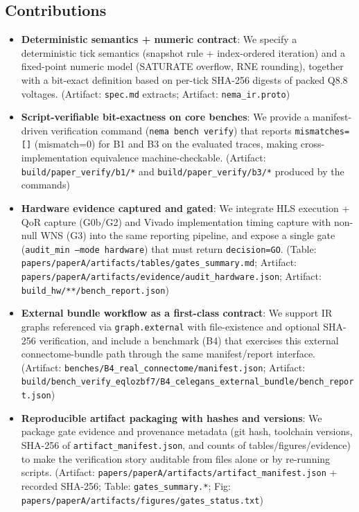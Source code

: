 \subsection{Contributions}
\begin{itemize}
\item \textbf{Deterministic semantics + numeric contract}: We specify a deterministic tick semantics (snapshot rule + index-ordered iteration) and a fixed-point numeric model (SATURATE overflow, RNE rounding), together with a bit-exact definition based on per-tick SHA-256 digests of packed Q8.8 voltages. (Artifact: \texttt{spec.md} extracts; Artifact: \texttt{nema\_ir.proto})
\item \textbf{Script-verifiable bit-exactness on core benches}: We provide a manifest-driven verification command (\texttt{nema bench verify}) that reports \texttt{mismatches=[]} (mismatch=0) for B1 and B3 on the evaluated traces, making cross-implementation equivalence machine-checkable. (Artifact: \texttt{build/paper\_verify/b1/*} and \texttt{build/paper\_verify/b3/*} produced by the commands)
\item \textbf{Hardware evidence captured and gated}: We integrate HLS execution + QoR capture (G0b/G2) and Vivado implementation timing capture with non-null WNS (G3) into the same reporting pipeline, and expose a single gate (\texttt{audit\_min --mode hardware}) that must return \texttt{decision=GO}. (Table: \texttt{papers/paperA/artifacts/tables/gates\_summary.md}; Artifact: \texttt{papers/paperA/artifacts/evidence/audit\_hardware.json}; Artifact: \texttt{build\_hw/**/bench\_report.json})
\item \textbf{External bundle workflow as a first-class contract}: We support IR graphs referenced via \texttt{graph.external} with file-existence and optional SHA-256 verification, and include a benchmark (B4) that exercises this external connectome-bundle path through the same manifest/report interface. (Artifact: \texttt{benches/B4\_real\_connectome/manifest.json}; Artifact: \texttt{build/bench\_verify\_eqlozbf7/B4\_celegans\_external\_bundle/bench\_report.json})
\item \textbf{Reproducible artifact packaging with hashes and versions}: We package gate evidence and provenance metadata (git hash, toolchain versions, SHA-256 of \texttt{artifact\_manifest.json}, and counts of tables/figures/evidence) to make the verification story auditable from files alone or by re-running scripts. (Artifact: \texttt{papers/paperA/artifacts/artifact\_manifest.json} + recorded SHA-256; Table: \texttt{gates\_summary.*}; Fig: \texttt{papers/paperA/artifacts/figures/gates\_status.txt})
\end{itemize}
